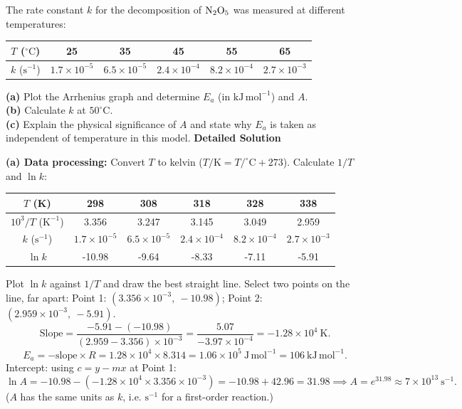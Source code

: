\documentclass[11pt]{article}
\begin{document}
\begin{exoresolu}
The rate constant $k$ for the decomposition of $\ce{N2O5}$ was measured at different temperatures:

\begin{center}
\begin{tabular}{|c|ccccc|}\hline
$T$ ($^\circ\mathrm{C}$) & 25 & 35 & 45 & 55 & 65 \\ \hline
$k$ ($\mathrm{s^{-1}}$) & $1.7 \times 10^{-5}$ & $6.5 \times 10^{-5}$ & $2.4 \times 10^{-4}$ & $8.2 \times 10^{-4}$ & $2.7 \times 10^{-3}$ \\ \hline
\end{tabular}
\end{center}

\textbf{(a)} Plot the Arrhenius graph and determine $E_a$ (in $\mathrm{kJ\,mol^{-1}}$) and $A$. \\
\textbf{(b)} Calculate $k$ at $50^\circ\mathrm{C}$. \\
\textbf{(c)} Explain the physical significance of $A$ and state why $E_a$ is taken as independent of temperature in this model.
\tcblower
\textbf{Detailed Solution}

\textbf{(a) Data processing:} Convert $T$ to kelvin ($T/\mathrm{K} = T/^\circ\mathrm{C} + 273$). Calculate $1/T$ and $\ln k$:

\begin{center}
\begin{tabular}{|c|ccccc|}\hline
$T$ (K) & 298 & 308 & 318 & 328 & 338 \\ \hline
$10^3/T$ ($\mathrm{K^{-1}}$) & 3.356 & 3.247 & 3.145 & 3.049 & 2.959 \\ \hline
$k$ ($\mathrm{s^{-1}}$) & $1.7\times 10^{-5}$ & $6.5\times 10^{-5}$ & $2.4\times 10^{-4}$ & $8.2\times 10^{-4}$ & $2.7\times 10^{-3}$ \\ \hline
$\ln k$ & -10.98 & -9.64 & -8.33 & -7.11 & -5.91 \\ \hline
\end{tabular}
\end{center}

Plot $\ln k$ against $1/T$ and draw the best straight line. Select two points on the line, far apart:
Point 1: $(3.356 \times 10^{-3},\ -10.98)$; Point 2: $(2.959 \times 10^{-3},\ -5.91)$.
\[ \text{Slope} = \frac{-5.91 - (-10.98)}{(2.959 - 3.356)\times 10^{-3}} = \frac{5.07}{-3.97 \times 10^{-4}} = -1.28 \times 10^{4}\ \mathrm{K}. \]
\[ E_a = -\text{slope} \times R = 1.28 \times 10^{4} \times 8.314 = 1.06 \times 10^{5}\ \mathrm{J\,mol^{-1}} = \boxed{106\ \mathrm{kJ\,mol^{-1}}}. \]
Intercept: using $c = y - mx$ at Point 1:
\[ \ln A = -10.98 - (-1.28 \times 10^{4} \times 3.356 \times 10^{-3}) = -10.98 + 42.96 = 31.98 \implies A = e^{31.98} \approx \boxed{7 \times 10^{13}\ \mathrm{s^{-1}}}. \]
($A$ has the same units as $k$, i.e. $\mathrm{s^{-1}}$ for a first-order reaction.)


\end{exoresolu}
\end{document}
